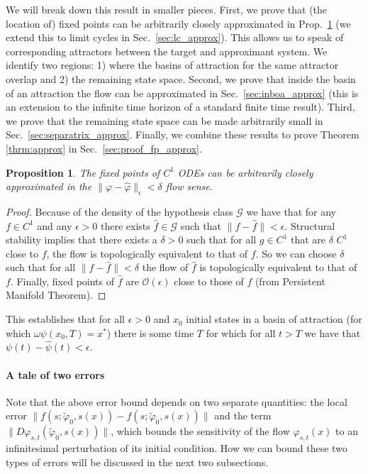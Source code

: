 \documentclass{article}
\newtheorem{proposition}{Proposition}
\theoremstyle{definition}
\theoremstyle{remark}
\newcounter{ct}
\begin{document}
We will break down this result in smaller pieces. 
First, we prove that (the location of) fixed points can be arbitrarily closely approximated in Prop.~\ref{prop:fp_approx} (we extend this to limit cycles in Sec.~\ref{sec:lc_approx}).
This allows us to speak of corresponding attractors between the target and approximant system.
We identify two regions: 1) where the basins of attraction for the same attractor overlap and 2) the remaining state space.
Second, we prove that inside the basin of an attraction the flow can be approximated in Sec.~\ref{sec:inboa_approx} (this is an extension to the infinite time horizon of a standard finite time result). %
Third, we prove that the remaining state space can be made arbitrarily small in Sec.~\ref{sec:separatrix_approx}.
Finally, we combine these results to prove Theorem \ref{thrm:approx} in Sec.~\ref{sec:proof_fp_approx}.

\begin{proposition}\label{prop:fp_approx}
The fixed points of $C^1$ ODEs can be arbitrarily closely approximated in the $\|\varphi-\hat \varphi\|_\epsilon < \delta$ flow sense.
\end{proposition}

\begin{proof}
Because of the density of the hypothesis class $\mathcal{G}$ we have that for any $f\in C^1$ and any $\epsilon>0$
there exists $\hat f\in\mathcal{G}$ such that $\|f-\hat f\|<\epsilon$.
%
Structural stability implies that there exists a $\delta>0$ such that for all $g\in C^1$ that are $\delta$ $C^1$ close to $f$, the flow is topologically equivalent to that of $f$.
%
So we can choose $\delta$ such that for all $\|f-\hat f\|<\delta$ the flow of $\hat f$ is topologically equivalent to that of $f$.
Finally, fixed points of $\hat f$ are $\mathcal{O}(\epsilon)$ close to those of $f$ (from Persistent Manifold Theorem\cite{jones1995gspt}).
\end{proof}

This establishes that for all $\epsilon>0$ and $x_0$ initial states in a basin of attraction (for which $\omega \psi(x_0,T) = x^*$) there is some time $T$ for which for all $t>T$ we have that $\psi(t)-\hat \psi(t)<\epsilon$.


\paragraph{A tale of two errors}
Note that the above error bound depends on two separate quantities: the local error 
$\| f(s; \tilde{\varphi}_0, s(x)) - f(s; \tilde{\varphi}_0, s(x)) \|$ 
 and the term 
$\| D\varphi_{s,t}(\tilde{\varphi}_0, s(x)) \|$, 
which bounds the sensitivity of the flow $\varphi_{s,t}(x)$ to an infinitesimal perturbation of its initial condition.
How we can bound these two types of errors will be discussed in the next two subsections.%
\end{document}
